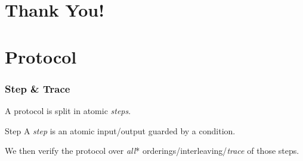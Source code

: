 \documentclass[aspectratio=169]{beamer}
\begin{document}




















\section{Thank You!}


\section[Wait! What's a protocol in you setting?]{Protocol}

\begin{frame}
  \frametitle{Step \& Trace}

  A protocol is split in atomic \emph{steps}.\pause
  \begin{mdefenv}{Step}{}
    A \emph{step} is an atomic input/output guarded by a condition.
  \end{mdefenv}
  \pause

  We then verify the protocol over \emph{all}* orderings/interleaving/\emph{trace} of those steps.

\end{frame}
\end{document}
